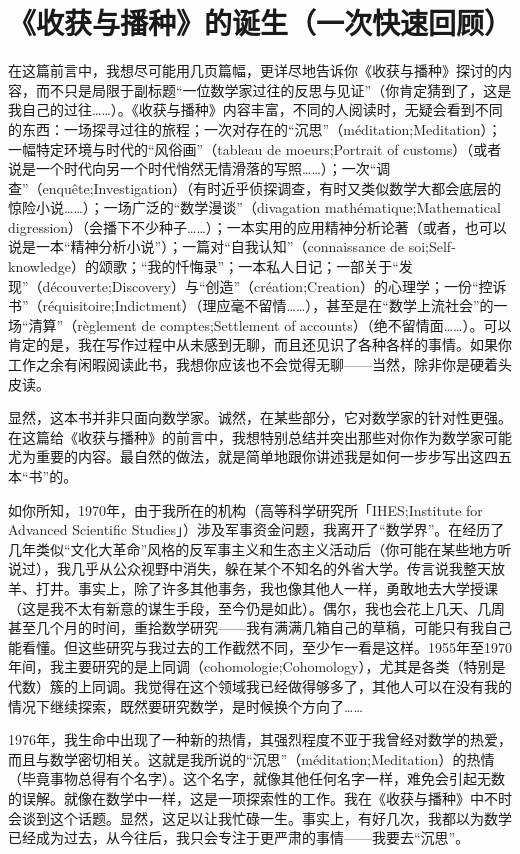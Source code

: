 \section{《收获与播种》的诞生（一次快速回顾）}

在这篇前言中，我想尽可能用几页篇幅，更详尽地告诉你《收获与播种》探讨的内容，而不只是局限于副标题“一位数学家过往的反思与见证”（你肯定猜到了，这是我自己的过往……）。《收获与播种》内容丰富，不同的人阅读时，无疑会看到不同的东西：一场探寻过往的旅程；一次对存在的“沉思”（méditation;Meditation）；一幅特定环境与时代的“风俗画”（tableau de moeurs;Portrait of customs）（或者说是一个时代向另一个时代悄然无情滑落的写照……）；一次“调查”（enquête;Investigation）（有时近乎侦探调查，有时又类似数学大都会底层的惊险小说……）；一场广泛的“数学漫谈”（divagation mathématique;Mathematical digression）（会播下不少种子……）；一本实用的应用精神分析论著（或者，也可以说是一本“精神分析小说”）；一篇对“自我认知”（connaissance de soi;Self-knowledge）的颂歌；“我的忏悔录”；一本私人日记；一部关于“发现”（découverte;Discovery）与“创造”（création;Creation）的心理学；一份“控诉书”（réquisitoire;Indictment）（理应毫不留情……），甚至是在“数学上流社会”的一场“清算”（règlement de comptes;Settlement of accounts）（绝不留情面……）。可以肯定的是，我在写作过程中从未感到无聊，而且还见识了各种各样的事情。如果你工作之余有闲暇阅读此书，我想你应该也不会觉得无聊——当然，除非你是硬着头皮读。

显然，这本书并非只面向数学家。诚然，在某些部分，它对数学家的针对性更强。在这篇给《收获与播种》的前言中，我想特别总结并突出那些对你作为数学家可能尤为重要的内容。最自然的做法，就是简单地跟你讲述我是如何一步步写出这四五本“书”的。

如你所知，1970年，由于我所在的机构（高等科学研究所「IHES;Institute for Advanced Scientific Studies」）涉及军事资金问题，我离开了“数学界”。在经历了几年类似“文化大革命”风格的反军事主义和生态主义活动后（你可能在某些地方听说过），我几乎从公众视野中消失，躲在某个不知名的外省大学。传言说我整天放羊、打井。事实上，除了许多其他事务，我也像其他人一样，勇敢地去大学授课（这是我不太有新意的谋生手段，至今仍是如此）。偶尔，我也会花上几天、几周甚至几个月的时间，重拾数学研究——我有满满几箱自己的草稿，可能只有我自己能看懂。但这些研究与我过去的工作截然不同，至少乍一看是这样。1955年至1970年间，我主要研究的是上同调（cohomologie;Cohomology），尤其是各类（特别是代数）簇的上同调。我觉得在这个领域我已经做得够多了，其他人可以在没有我的情况下继续探索，既然要研究数学，是时候换个方向了……

1976年，我生命中出现了一种新的热情，其强烈程度不亚于我曾经对数学的热爱，而且与数学密切相关。这就是我所说的“沉思”（méditation;Meditation）的热情（毕竟事物总得有个名字）。这个名字，就像其他任何名字一样，难免会引起无数的误解。就像在数学中一样，这是一项探索性的工作。我在《收获与播种》中不时会谈到这个话题。显然，这足以让我忙碌一生。事实上，有好几次，我都以为数学已经成为过去，从今往后，我只会专注于更严肃的事情——我要去“沉思”。

